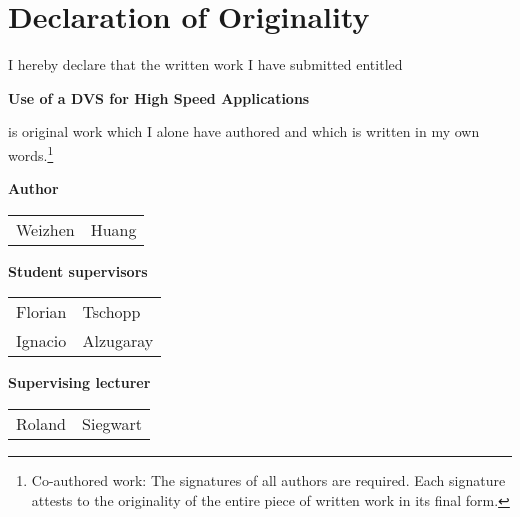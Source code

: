 
\section*{Declaration of Originality}

\vspace{1cm}

I hereby declare that the written work I have submitted entitled

\vspace{0.5cm}

\textbf{Use of a DVS for High Speed Applications}

\vspace{0.5cm}

is original work which I alone have authored and which is written in
my own words.\footnote{Co-authored work: The signatures of all authors
  are required. Each signature attests to the originality of the
  entire piece of written work in its final form.}

\vspace{1cm}

\textbf{Author}

\vspace{0.5cm}

\begin{tabular}{ p{5cm} p{5cm} }
  Weizhen & Huang \\
\end{tabular}

\vspace{0.5cm}

\textbf{Student supervisors}

\vspace{0.5cm}

\begin{tabular}{ p{5cm} p{5cm} }
  Florian& Tschopp\\
  Ignacio& Alzugaray\\
\end{tabular}

\vspace{0.5cm}

\textbf{Supervising lecturer}

\vspace{0.5cm}

\begin{tabular}{ p{5cm} p{5cm} }
  Roland & Siegwart \\
\end{tabular}

